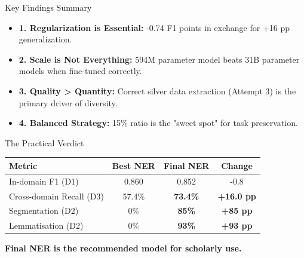 \documentclass[10pt]{beamer}
\def\tpage{}
\newcommand{\tp}[1]{\def\tpage{#1}}
\begin{document}
\begin{frame}{Key Findings Summary}
    \tp{57}
    \begin{itemize}
        \item \textbf{1. Regularization is Essential:} -0.74 F1 points in exchange for +16 pp generalization.
        \item \textbf{2. Scale is Not Everything:} 594M parameter model beats 31B parameter models when fine-tuned correctly.
        \item \textbf{3. Quality > Quantity:} Correct silver data extraction (Attempt 3) is the primary driver of diversity.
        \item \textbf{4. Balanced Strategy:} 15\% ratio is the "sweet spot" for task preservation.
    \end{itemize}
\end{frame}

\begin{frame}{The Practical Verdict}
    \tp{58}
    \begin{table}
        \centering
        \begin{tabular}{lccc}
            \toprule
            \textbf{Metric} & \textbf{Best NER} & \textbf{Final NER} & \textbf{Change} \\
            \midrule
            In-domain F1 (D1) & 0.860 & 0.852 & -0.8 \\
            Cross-domain Recall (D3) & 57.4\% & \textbf{73.4\%} & \textbf{+16.0 pp} \\
            Segmentation (D2) & 0\% & \textbf{85\%} & \textbf{+85 pp} \\
            Lemmatisation (D2) & 0\% & \textbf{93\%} & \textbf{+93 pp} \\
            \bottomrule
        \end{tabular}
    \end{table}
    \vfill
    \begin{center}
        \large \textbf{Final NER is the recommended model for scholarly use.}
    \end{center}
\end{frame}
\end{document}
